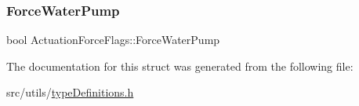\mbox{\label{structActuationForceFlags_ab969137846bc6b38bbe3c204e8a4975e}} 
\subsubsection{\texorpdfstring{Force\+Water\+Pump}{ForceWaterPump}}
{\footnotesize\ttfamily bool Actuation\+Force\+Flags\+::\+Force\+Water\+Pump}



The documentation for this struct was generated from the following file\+:\begin{DoxyCompactItemize}
\item 
src/utils/\hyperlink{typeDefinitions_8h}{type\+Definitions.\+h}\end{DoxyCompactItemize}
